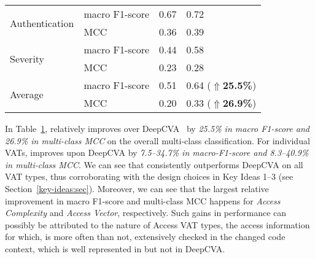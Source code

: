 \begin{table}[t]
\begin{center}
\begin{tabular}{l|p{1.9cm}<{\centering}|p{1.5cm}<{\centering}|p{1.5cm}<{\centering}}
			\hline
			\multirow{2}{*}{Authentication}  & macro F1-score                             &   0.67         & 0.72\\
			\cline{2-4}
			                                 & MCC                                 &   0.36         & 0.39\\
			\hline
			\multirow{2}{*}{Severity}        & macro F1-score                             &   0.44         & 0.58\\
			\cline{2-4}
			                                 & MCC                                 &   0.23         & 0.28\\
			\hline
			\hline
			\multirow{2}{*}{Average}         & macro F1-score                             &    0.51        & 0.64 ($\Uparrow${\bf 25.5\%})\\
			\cline{2-4}
			                                 & MCC                                 & 0.20           & 0.33 ($\Uparrow${\bf 26.9\%})\\
            \hline
		\end{tabular}
		\label{rq1_results}
	\end{center}
\end{table}

In Table~\ref{rq1_results}, {\tool} relatively improves over DeepCVA~\cite{deepCVA-ase21} by {\em 25.5\% in macro F1-score and
26.9\% in multi-class MCC} on the overall multi-class classification. For individual VATs, {\tool} improves upon DeepCVA by {\em 7.5--34.7\% in macro-F1-score and 8.3--40.9\% in multi-class MCC}. We can see that {\tool} consistently outperforms DeepCVA on all VAT types, thus corroborating with the design choices in Key Ideas 1--3 (see Section~\ref{key-ideas:sec}). Moreover, we can see that the largest relative improvement in macro F1-score and multi-class MCC happens for {\em Access Complexity} and {\em Access Vector}, respectively. Such gains in performance can possibly be attributed to the nature of Access VAT types, the access information for which, is more often than not, extensively checked in the changed code context, which is well represented in {\tool} but not in DeepCVA.



